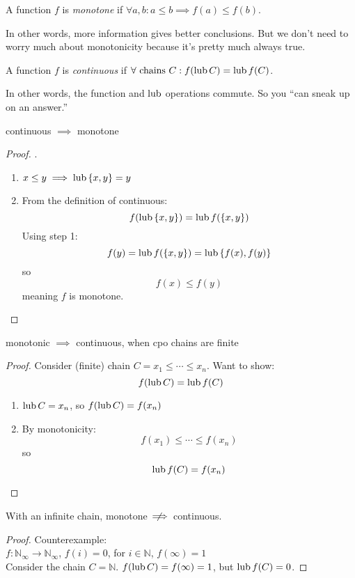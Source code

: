\documentclass{article}
\begin{document}
\begin{definition}
  A function $f$ is \emph{monotone} if $\forall a,b:a\leq b \implies f(a) \leq
  f(b)$. 
\end{definition}

\noindent In other words, more information gives better conclusions. But we
don't need to worry much about monotonicity because it's pretty much always
true.

\begin{definition}
  A function $f$ is \emph{continuous} if $\forall \textrm{ chains } C:
  f(\operatorname{lub}{C}) = \operatorname{lub}{f(C)}$.
\end{definition}

\noindent In other words, the function and $\operatorname{lub}$ operations commute. So you
``can sneak up on an answer.''

\begin{theorem} \label{thm:contmono}
  continuous $\implies$ monotone
\end{theorem}
%
\begin{proof}.
  \begin{enumerate}
  \item $x\leq y\implies \operatorname{lub}{\{x,y\}} = y$
  \item From the definition of continuous:
    $$f(\operatorname{lub}{\{x,y\}}) = \operatorname{lub}{f(\{x,y\})}$$
    Using step 1:
    $$f(y) = \operatorname{lub}{f(\{x,y\})} = \operatorname{lub}{\{f(x),f(y)\}}$$
    so
    $$f(x)\leq f(y)$$
    meaning $f$ is monotone.
  \end{enumerate}
\end{proof}

\begin{theorem}
  monotonic $\implies$ continuous, when cpo chains are finite
\end{theorem}
%
\begin{proof}
  Consider (finite) chain $C = x_1\leq\cdots\leq x_n$. Want to show: 
$$f(\operatorname{lub}{C}) = \operatorname{lub}{f(C)}$$
\begin{enumerate}
  \item $\operatorname{lub}{C} = x_n$, so $f(\operatorname{lub}{C}) = f(x_n)$
  \item By monotonicity:
    $$f(x_1)\leq\cdots\leq f(x_n)$$
    so
    $$\operatorname{lub}{f(C)} = f(x_n)$$
\end{enumerate}
\end{proof}

\begin{theorem}
  With an infinite chain, monotone $\;\;\not\!\!\!\!\implies\!$ continuous.
\end{theorem}
%
\begin{proof}
  Counterexample:\\
  $f:\mathbb{N}_\infty\rightarrow\mathbb{N}_\infty$, $f(i) = 0$, for $i \in \mathbb{N}$, $f(\infty) = 1$\\
  Consider the chain $C = \mathbb{N}$. $f(\operatorname{lub}{C}) = f(\infty) = 1$, but $\operatorname{lub}{f(C)} = 0$.
\end{proof}
\end{document}
